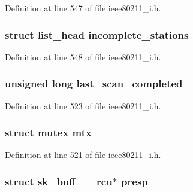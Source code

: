 Definition at line 547 of file ieee80211\-\_\-i.\-h.

\hypertarget{structieee80211__if__ibss_a18703abd5d82801e889c2c13282d2f5c}{
\subsubsection[{incomplete\-\_\-stations}]{\setlength{\rightskip}{0pt plus 5cm}struct list\-\_\-head incomplete\-\_\-stations}}\label{structieee80211__if__ibss_a18703abd5d82801e889c2c13282d2f5c}


Definition at line 548 of file ieee80211\-\_\-i.\-h.

\hypertarget{structieee80211__if__ibss_a02630c17c918fc4068543524fa1c2793}{
\subsubsection[{last\-\_\-scan\-\_\-completed}]{\setlength{\rightskip}{0pt plus 5cm}unsigned long last\-\_\-scan\-\_\-completed}}\label{structieee80211__if__ibss_a02630c17c918fc4068543524fa1c2793}


Definition at line 523 of file ieee80211\-\_\-i.\-h.

\hypertarget{structieee80211__if__ibss_a06f637951b74c996f2e4987a7be1dbdd}{
\subsubsection[{mtx}]{\setlength{\rightskip}{0pt plus 5cm}struct mutex mtx}}\label{structieee80211__if__ibss_a06f637951b74c996f2e4987a7be1dbdd}


Definition at line 521 of file ieee80211\-\_\-i.\-h.

\hypertarget{structieee80211__if__ibss_a9daf15f2ed9d31b8120ac9c337ca9c62}{
\subsubsection[{presp}]{\setlength{\rightskip}{0pt plus 5cm}struct sk\-\_\-buff \-\_\-\-\_\-rcu$\ast$ presp}}\label{structieee80211__if__ibss_a9daf15f2ed9d31b8120ac9c337ca9c62}


